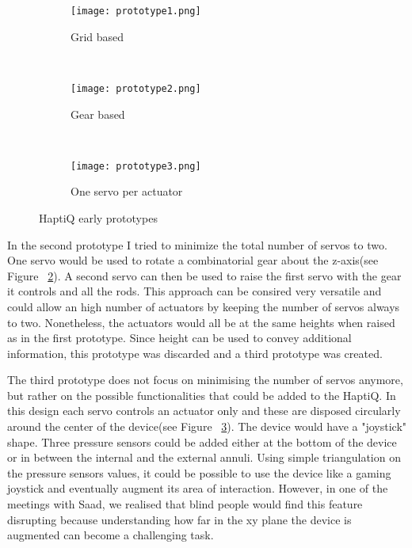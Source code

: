 \begin{figure}
        \centering
        \begin{subfigure}[H]{0.5\textwidth}
                \texttt{[image: prototype1.png]}
                \caption{Grid based}
                \label{fig:first prototype}
        \end{subfigure}%
        ~ %
        \begin{subfigure}[H]{0.5\textwidth}
                \texttt{[image: prototype2.png]}
                \caption{Gear based}
                \label{fig:second prototype}
        \end{subfigure}
        ~ %
        \begin{subfigure}[H]{0.5\textwidth}
                \texttt{[image: prototype3.png]}
                \caption{One servo per actuator}
                \label{fig:third prototype}
        \end{subfigure}
        \caption{HaptiQ early prototypes}\label{fig:HaptiQ-early-prototypes}
\end{figure}

In the second prototype I tried to minimize the total number of servos to two. One servo would be used to rotate a combinatorial gear about the z-axis(see Figure ~\ref{fig:second prototype}). A second servo can then be used to raise the first servo with the gear it controls and all the rods. This approach can be consired very versatile and could allow an high number of actuators by keeping the number of servos always to two. Nonetheless, the actuators would all be at the same heights when raised as in the first prototype. Since height can be used to convey additional information, this prototype was discarded and a third prototype was created.

The third prototype does not focus on minimising the number of servos anymore, but rather on the possible functionalities that could be added to the HaptiQ. In this design each servo controls an actuator only and these are disposed circularly around the center of the device(see Figure ~\ref{fig:third prototype}). The device would have a "joystick" shape. Three pressure sensors could be added either at the bottom of the device or in between the internal and the external annuli. Using simple triangulation on the pressure sensors values, it could be possible to use the device like a gaming joystick and eventually augment its area of interaction. However, in one of the meetings with Saad, we realised that blind people would find this feature disrupting because understanding how far in the xy plane the device is augmented can become a challenging task. 

